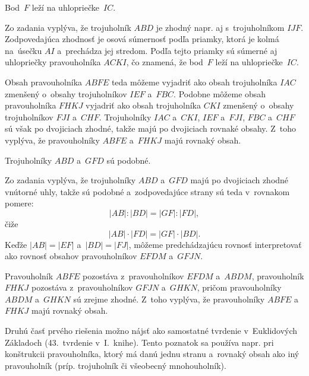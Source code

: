 {%
\napad
Bod~$F$ leží na uhlopriečke~$IC$.

\riesenie
Zo zadania vyplýva, že trojuholník $ABD$ je zhodný napr. aj s~trojuholníkom
$IJF$.
Zodpovedajúca zhodnosť je osová súmernosť podľa priamky, ktorá je kolmá
na~úsečku $AI$ a~prechádza jej stredom.
Podľa tejto priamky sú súmerné aj uhlopriečky pravouholníka
$ACKI$, čo znamená, že bod~$F$ leží na uhlopriečke~$IC$.
%

Obsah pravouholníka $ABFE$ teda môžeme vyjadriť ako obsah trojuholníka
$IAC$ zmenšený o~obsahy trojuholníkov $IEF$ a~$FBC$.
Podobne môžeme obsah pravouholníka $FHKJ$ vyjadriť ako obsah trojuholníka
$CKI$ zmenšený o~obsahy trojuholníkov $FJI$ a~$CHF$.
Trojuholníky $IAC$ a~$CKI$, $IEF$ a~$FJI$, $FBC$ a~$CHF$ sú však po
dvojiciach zhodné, takže majú po dvojiciach rovnaké obsahy.
Z~toho vyplýva, že pravouholníky $ABFE$ a~$FHKJ$ majú rovnaký obsah.

\inynapad
Trojuholníky $ABD$ a~$GFD$ sú podobné.

\ineriesenie
Zo zadania vyplýva, že trojuholníky $ABD$ a~$GFD$ majú po dvojiciach zhodné vnútorné uhly,
takže sú podobné a~zodpovedajúce strany sú teda v~rovnakom pomere:
$$
|AB|:|BD|=|GF|:|FD|,
$$
čiže
$$
|AB|\cdot|FD|=|GF|\cdot|BD|.
$$
Keďže $|AB|=|EF|$ a~$|BD|=|FJ|$, môžeme predchádzajúcu rovnosť interpretovať ako
rovnosť obsahov pravouholníkov $EFDM$ a~$GFJN$.
%

Pravouholník $ABFE$ pozostáva z~pravouholníkov $EFDM$ a~$ABDM$,
pravouholník $FHKJ$ pozostáva z~pravouholníkov $GFJN$ a~$GHKN$,
pričom pravouholníky $ABDM$ a~$GHKN$ sú zrejme zhodné.
Z~toho vyplýva, že pravouholníky $ABFE$ a~$FHKJ$ majú rovnaký obsah.

\poznamka
Druhú časť prvého riešenia možno nájsť ako samostatné tvrdenie v~Euklidových
Základoch (43.~tvrdenie v~I.~knihe).
Tento poznatok sa používa napr. pri konštrukcii pravouholníka, ktorý má danú
jednu stranu a~rovnaký obsah ako iný pravouholník (príp. trojuholník či
všeobecný mnohouholník).
}

